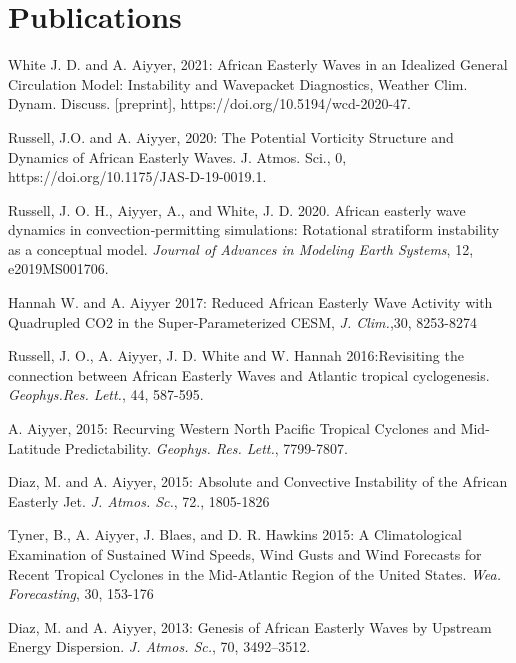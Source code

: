\section*{Publications}

\begin{ilist}



  
\item White J. D. and A. Aiyyer, 2021: African Easterly Waves in an Idealized General Circulation Model: Instability and Wavepacket Diagnostics, Weather Clim. Dynam. Discuss. [preprint], https://doi.org/10.5194/wcd-2020-47.

 
\item Russell, J.O. and A. Aiyyer, 2020: The Potential Vorticity Structure and Dynamics of African Easterly Waves. J. Atmos. Sci., 0, https://doi.org/10.1175/JAS-D-19-0019.1.

\item Russell, J. O. H., Aiyyer, A., and White, J. D. 2020. African easterly wave dynamics in convection‐permitting simulations: Rotational stratiform instability as a conceptual model. \emph{Journal of Advances in Modeling Earth Systems}, 12, e2019MS001706.
  
\item Hannah W. and A. Aiyyer 2017: Reduced African Easterly Wave Activity with Quadrupled
  CO2 in the Super-Parameterized CESM, \emph{J. Clim.},30, 8253-8274

\item Russell, J. O., A. Aiyyer, J. D. White and W. Hannah 2016:Revisiting the connection between African Easterly Waves and Atlantic tropical cyclogenesis.  \emph{Geophys.Res. Lett.}, 44, 587-595.

\item A. Aiyyer, 2015: Recurving Western North Pacific Tropical Cyclones and Mid-Latitude Predictability. \emph{Geophys. Res. Lett.}, 7799-7807.

\item Diaz, M. and A. Aiyyer, 2015: Absolute and Convective Instability of the African Easterly Jet. \emph{J. Atmos. Sc.}, 72., 1805-1826
  
\item Tyner, B., A. Aiyyer, J. Blaes, and D. R. Hawkins 2015: A Climatological Examination of
Sustained Wind Speeds, Wind Gusts and Wind Forecasts for Recent Tropical Cyclones in the
Mid-Atlantic Region of the United States. \emph{Wea. Forecasting}, 30, 153-176


\item Diaz, M. and A. Aiyyer, 2013: Genesis of African Easterly Waves by Upstream Energy Dispersion. \emph{J. Atmos. Sc.}, 70, 3492–3512. 


\end{ilist}
